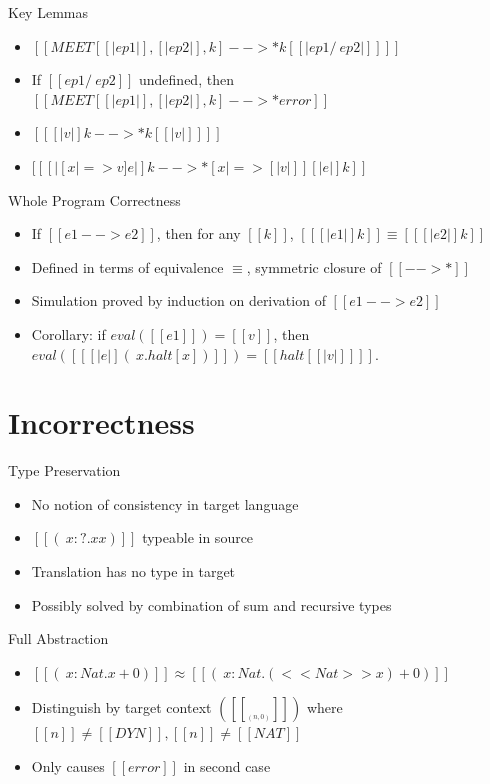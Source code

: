 \documentclass[10pt]{beamer}
\begin{document}
\begin{frame}[fragile]{Key Lemmas}
  \begin{itemize}
    \item $[[ MEET[ [|ep1|], [|ep2|], k ]   -->* k[ [|ep1 /\ ep2|] ]  ]]$
    \item If $[[ep1 /\ ep2]]$ undefined, then $[[ MEET[ [|ep1|], [|ep2|], k ] -->* error ]]$
    \item $[[ [|v|]k -->* k[ [|v|] ] ]]$
    \item $[[ [|[x |=> v]e|]k -->* [x |=> [|v|] ][|e|]k   ]]$
  \end{itemize}
\end{frame}

\begin{frame}[fragile]{Whole Program Correctness}
  \begin{itemize}
    \item 
    If $[[e1 --> e2]]$, then for any $[[k]]$, $[[ [|e1|]k ]] \equiv [[ [|e2|]k ]]$

    \item Defined in terms of equivalence $\equiv$, symmetric closure of $[[-->*]]$
    
    \item Simulation proved by induction on derivation of $[[e1 --> e2]]$
    
    \item Corollary: if $eval([[e1]])= [[v]]$, then $eval([[ [|e|](\ x . halt[x]) ]]) = [[halt[ [|v|] ] ]]$.
  \end{itemize}
\end{frame}

\section{Incorrectness}

\begin{frame}[fragile]{Type Preservation }
  \begin{itemize}
    \item No notion of consistency in target language
    \item $[[(\ x : ? . x x)]]$ typeable in source
    \item Translation has no type in target 
    \item Possibly solved by combination of sum and recursive types
  \end{itemize}
\end{frame}

\begin{frame}[fragile]{Full Abstraction }
  \begin{itemize}
    \item $[[(\ x : Nat . x + 0 )]] \approx [[(\ x : Nat . (<<Nat>>x) + 0 )]]$
    \item Distinguish by target context  $([[  __ (n,0)  ]])$ where $[[n]]\neq[[DYN]], [[n]] \neq [[NAT]]$
    \item Only causes $[[error]]$ in second case
  \end{itemize}
\end{frame} 
\end{document}
